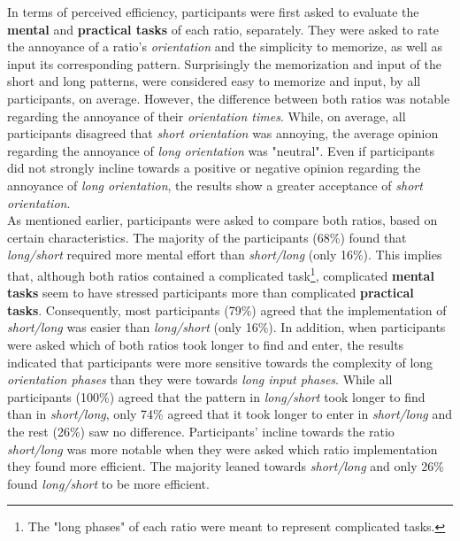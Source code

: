 In terms of perceived efficiency, participants were first asked to evaluate the \textbf{mental} and \textbf{practical tasks} of each ratio, separately. They were asked to rate the annoyance of a ratio's \textit{orientation} and the simplicity to memorize, as well as input its corresponding pattern. Surprisingly the memorization and input of the short and long patterns, were considered easy to memorize and input, by all participants, on average. However, the difference between both ratios was notable regarding the annoyance of their \textit{orientation times}. While, on average, all participants disagreed that \textit{short orientation} was annoying, the average opinion regarding the annoyance of \textit{long orientation} was "neutral". Even if participants did not strongly incline towards a positive or negative opinion regarding the annoyance of \textit{long orientation}, the results show a greater acceptance of \textit{short orientation}.\\

As mentioned earlier, participants were asked to compare both ratios, based on certain characteristics. The majority of the participants (68\%) found that \textit{long/short} required more mental effort than \textit{short/long} (only 16\%). This implies that, although both ratios contained a complicated task\footnote{The "long phases" of each ratio were meant to represent complicated tasks.}, complicated \textbf{mental tasks} seem to have stressed participants more than complicated \textbf{practical tasks}. Consequently, most participants (79\%) agreed that the implementation of \textit{short/long} was easier than \textit{long/short} (only 16\%). In addition, when participants were asked which of both ratios took longer to find and enter, the results indicated that participants were more sensitive towards the complexity of long \textit{orientation phases} than they were towards \textit{long input phases}. While all participants (100\%) agreed that the pattern in \textit{long/short} took longer to find than in \textit{short/long}, only 74\% agreed that it took longer to enter in \textit{short/long} and the rest (26\%) saw no difference. Participants' incline towards the ratio \textit{short/long} was more notable when they were asked which ratio implementation they found more efficient. The majority leaned towards \textit{short/long} and only 26\% found \textit{long/short} to be more efficient. \\

